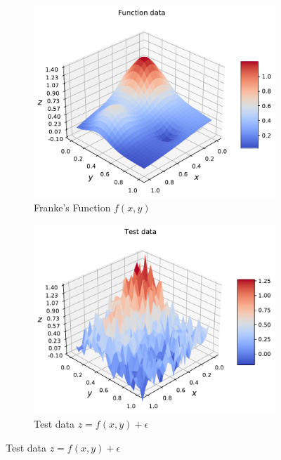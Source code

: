 \documentclass[norsk,a4paper,12pt]{scrartcl}
\begin{document}
\begin{figure}[H]
     \centering
     \begin{subfigure}[b]{0.49\textwidth}
         \centering
         \includegraphics[width=\textwidth]{figures/zprediction/func_data.pdf}
         \caption{Franke's Function $f(x,y)$}
         \label{fig:z_func}
     \end{subfigure}
    \hfill
     \begin{subfigure}[b]{0.49\textwidth}
         \centering
         \includegraphics[width=\textwidth]{figures/zprediction/test_data.pdf}
         \caption{Test data $z = f(x,y) + \epsilon$ }
         \label{fig:z_test}

\end{subfigure}
\end{figure}
\end{document}
